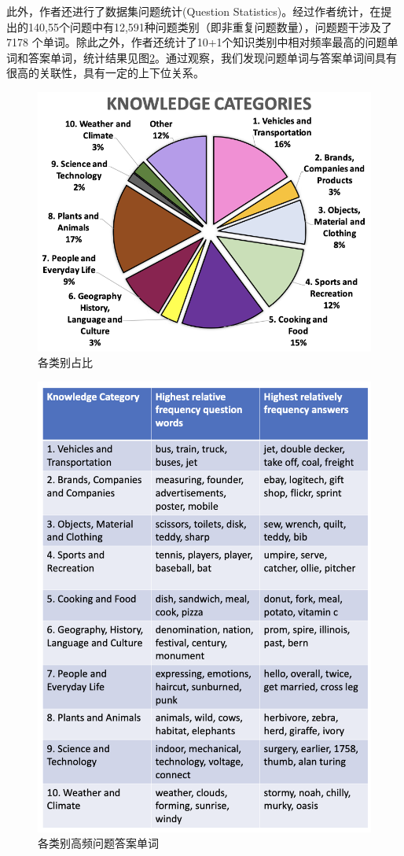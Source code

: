 \documentclass[conference,10pt]{IEEEtran}
\begin{document}
此外，作者还进行了数据集问题统计(Question Statistics)。经过作者统计，在提出的140,55个问题中有12,591种问题类别（即非重复问题数量），问题题干涉及了 7178 个单词。除此之外，作者还统计了10+1个知识类别中相对频率最高的问题单词和答案单词，统计结果见图\ref{statistics}。通过观察，我们发现问题单词与答案单词间具有很高的关联性，具有一定的上下位关系。
\begin{figure}
	\centering
	\includegraphics[scale=0.35]{figure/category.png}
	\caption{各类别占比}
	\label{category}
\end{figure}
\begin{figure}
	\centering
	\includegraphics[scale=0.33]{figure/statistics.png}
	\caption{各类别高频问题答案单词}
	\label{statistics}
\end{figure}
\end{document}
